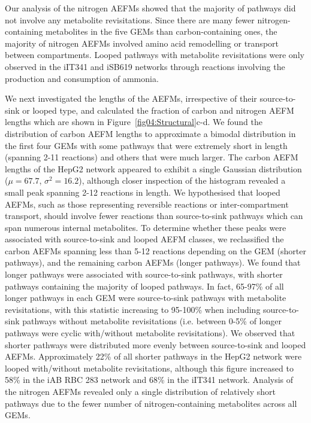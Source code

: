 \documentclass[12pt]{article}
\begin{document}
Our analysis of the nitrogen AEFMs showed that the majority of pathways
did not involve any metabolite revisitations. Since there are many fewer
nitrogen-containing metabolites in the five GEMs than carbon-containing
ones, the majority of nitrogen AEFMs involved amino acid remodelling or
transport between compartments. Looped pathways with metabolite
revisitations were only observed in the iIT341 and iSB619 networks through
reactions involving the production and consumption of ammonia. 

We next investigated the lengths of the AEFMs, irrespective of their
source-to-sink or looped type, and calculated the fraction of carbon and
nitrogen AEFM lengths which are shown in Figure~\ref{fig04:Structural}c-d.
We found the distribution of carbon AEFM lengths to approximate a bimodal
distribution in the first four GEMs with some pathways that were extremely
short in length (spanning 2-11 reactions) and others that were much
larger. The carbon AEFM lengths of the HepG2 network appeared to exhibit
a single Gaussian distribution ($\mu=67.7$, $\sigma^2=16.2$), although
closer inspection of the histogram revealed a small peak spanning 2-12
reactions in length. We hypothesised that looped AEFMs, such as those
representing reversible reactions or inter-compartment transport, should
involve fewer reactions than source-to-sink pathways which can span
numerous internal metabolites. To determine whether these peaks were
associated with source-to-sink and looped AEFM classes, we reclassified
the carbon AEFMs spanning less than 5-12 reactions depending on the GEM
(shorter pathways), and the remaining carbon AEFMs (longer pathways). We
found that longer pathways were associated with source-to-sink pathways,
with shorter pathways containing the majority of looped pathways. In fact,
65-97\% of all longer pathways in each GEM were source-to-sink pathways
with metabolite revisitations, with this statistic increasing to 95-100\%
when including source-to-sink pathways without metabolite revisitations
(i.e. between 0-5\% of longer pathways were cyclic with/without metabolite
revisitations). We observed that shorter pathways were distributed more
evenly between source-to-sink and looped AEFMs. Approximately 22\% of all
shorter pathways in the HepG2 network were looped with/without metabolite
revisitations, although this figure increased to 58\% in the iAB RBC 283
network and 68\% in the iIT341 network. Analysis of the nitrogen AEFMs
revealed only a single distribution of relatively short pathways due to
the fewer number of nitrogen-containing metabolites across all GEMs.
\end{document}
